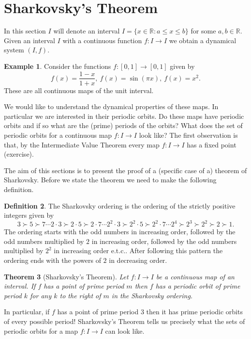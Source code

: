 \documentclass[12pt]{article}
\newtheorem{theorem}{Theorem}[section]
\theoremstyle{definition}
\newtheorem{definition}[theorem]{Definition}
\newtheorem{example}[theorem]{Example}
\theoremstyle{remark}
\begin{document}
\section{Sharkovsky's Theorem}
In this section $I$ will denote an interval $I = \{ x \in \mathbb{R} : a \le x \le  b\}$ for some $a,b\in \mathbb{R}$.
Given an interval $I$ with a continuous function $f: I \to I$ we obtain a dynamical system $(I,f)$. 
\begin{example}
Consider the functions $f: [0,1] \to [0,1]$ given by 
\[
f(x) = \frac{1-x}{1+x}, \ f(x) = \sin(\pi x), \ f(x) = x^2.
\]
These are all continuous maps of the unit interval.
\end{example}
We would like to understand the dynamical properties of these maps. In particular we are interested in their periodic orbits. Do these maps have periodic orbits and if so what are the (prime) periods of the orbits? What does the set of periodic orbits for a continuous map $f: I \to I$ look like? The first observation is that, by the Intermediate Value Theorem every map $f: I \to I$ has a fixed point (exercise).

The aim of this sections is to present the proof of a (specific case of a) theorem of Sharkovsky.
Before we state the theorem we need to make the following definition.

\begin{definition}
The Sharkovsky ordering is the ordering of the strictly positive integers given by
\[
3 \succ 5 \succ 7 \cdots 2 \cdot 3 \succ 2 \cdot 5 \succ  2 \cdot 7 \cdots 2^2 \cdot 3 \succ  2^2 \cdot5 \succ 2^2  \cdot 7 \cdots 2^4 \succ 2^3 \succ 2^2 \succ 2 \succ 1.
\]
The ordering starts with the odd numbers in increasing order, followed by the odd numbers multiplied by $2$ in increasing order, followed by the odd numbers multiplied by $2^2$ in increasing order e.t.c.. After following this pattern the ordering ends with the powers of $2$ in decreasing order.
\end{definition}

\begin{theorem}[Sharkovsky's Theorem]
Let $f: I \to I$ be a continuous map of an interval. If $f$ has a point of prime period $m$ then $f$ has a periodic orbit of prime period $k$ for any $k$ to the right of $m$ in the Sharkovsky ordering.
\end{theorem}

In particular, if $f$ has a point of prime period $3$ then it has prime periodic orbits of every possible period!
Sharkovsky's Theorem tells us precisely what the sets of periodic orbits for a map $f : I \to I$ can look like.
\end{document}

